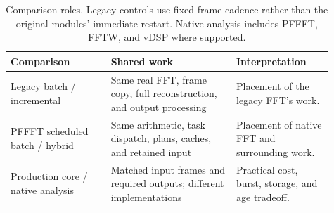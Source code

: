 \begin{table}[tb]
\centering\small
\begin{tabular}{@{}>{\raggedright\arraybackslash}p{0.29\linewidth}>{\raggedright\arraybackslash}p{0.35\linewidth}>{\raggedright\arraybackslash}p{0.27\linewidth}@{}}
\toprule
Comparison & Shared work & Interpretation \\
\midrule
Legacy batch / incremental & Same real FFT, frame copy, full reconstruction,
and output processing & Placement of the legacy FFT's work. \\
PFFFT scheduled batch / hybrid & Same arithmetic, task dispatch, plans,
caches, and retained input & Placement of native FFT and surrounding work. \\
Production core / native analysis & Matched input frames and required
outputs; different implementations & Practical cost, burst, storage,
and age tradeoff. \\
\bottomrule
\end{tabular}
\caption{Comparison roles. Legacy controls use fixed frame cadence rather than
the original modules' immediate restart. Native analysis includes PFFFT,
FFTW, and vDSP where supported.}
\label{tab:controls}
\end{table}
